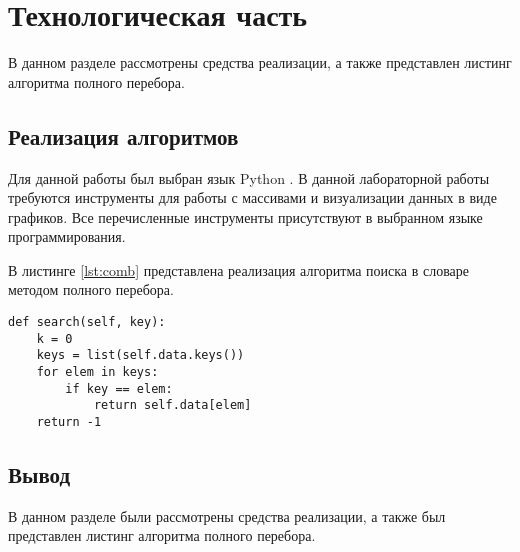 \chapter{Технологическая часть}
В данном разделе рассмотрены средства реализации, а также представлен листинг алгоритма полного перебора.

\section{Реализация алгоритмов}
Для данной работы был выбран язык Python \cite{python}. В данной лабораторной работы требуются инструменты для работы с массивами и визуализации данных в виде графиков. Все перечисленные инструменты присутствуют в выбранном языке программирования.

В листинге \ref{lst:comb} представлена реализация алгоритма поиска в словаре методом полного перебора.

\begin{center}
	\begin{lstlisting}[label=lst:comb,caption=Алгоритм поиска полным перебором]
def search(self, key):
	k = 0
	keys = list(self.data.keys())
	for elem in keys:
		if key == elem:
			return self.data[elem]
	return -1
	\end{lstlisting}
\end{center}


\section*{Вывод}
В данном разделе были рассмотрены средства реализации, а также был представлен листинг алгоритма полного перебора.